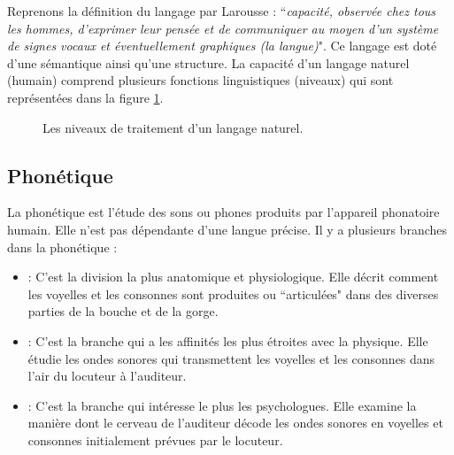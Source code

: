 \documentclass{KodeBook}
\begin{document}
Reprenons la définition du langage par Larousse : ``\textit{capacité, observée chez tous les hommes, d'exprimer leur pensée et de communiquer au moyen d'un système de signes vocaux et éventuellement graphiques (la langue)}".
Ce langage est doté d'une sémantique ainsi qu'une structure. 
La capacité d'un langage naturel (humain) comprend plusieurs fonctions linguistiques (niveaux) qui sont représentées dans la figure \ref{fig:niveaux}.

\begin{figure}[ht]
	\centering 
	\caption{Les niveaux de traitement d'un langage naturel. \label{fig:niveaux}}
\end{figure}

\subsection{Phonétique}

La phonétique est l'étude des sons ou phones produits par l'appareil phonatoire humain.
Elle n'est pas dépendante d'une langue précise. 
Il y a plusieurs branches dans la phonétique :
\begin{itemize}
	\item {} :  C'est la division la plus anatomique et physiologique. 
	Elle décrit comment les voyelles et les consonnes sont produites ou ``articulées" dans des diverses parties de la bouche et de la gorge.
	\item {} : C'est la branche qui a les affinités les plus étroites avec la physique. 
	Elle étudie les ondes sonores qui transmettent les voyelles et les consonnes dans l'air du locuteur à l'auditeur.
	\item {} : C'est la branche qui intéresse le plus les psychologues. 
	Elle examine la manière dont le cerveau de l'auditeur décode les ondes sonores en voyelles et consonnes initialement prévues par le locuteur.
\end{itemize}
\end{document}
